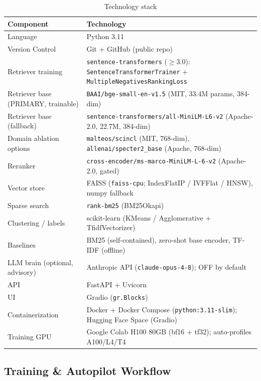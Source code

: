 \documentclass[12pt,a4paper]{article}
\begin{document}
\begin{table}[H]
\centering
\caption{Technology stack}
\small
\begin{tabularx}{\linewidth}{@{} l L @{}}
\toprule
\textbf{Component} & \textbf{Technology} \\
\midrule
Language & Python 3.11 \\
Version Control & Git + GitHub (public repo) \\
Retriever training & \texttt{sentence-transformers} ($\geq$3.0): \texttt{SentenceTransformerTrainer} + \texttt{MultipleNegativesRankingLoss} \\
Retriever base (PRIMARY, trainable) & \texttt{BAAI/bge-small-en-v1.5} (MIT, 33.4M params, 384-dim) \\
Retriever base (fallback) & \texttt{sentence-transformers/all-MiniLM-L6-v2} (Apache-2.0, 22.7M, 384-dim) \\
Domain ablation options & \texttt{malteos/scincl} (MIT, 768-dim), \texttt{allenai/specter2\_base} (Apache, 768-dim) \\
Reranker & \texttt{cross-encoder/ms-marco-MiniLM-L-6-v2} (Apache-2.0, gated) \\
Vector store & FAISS (\texttt{faiss-cpu}; IndexFlatIP / IVFFlat / HNSW), numpy fallback \\
Sparse search & \texttt{rank-bm25} (BM25Okapi) \\
Clustering / labels & scikit-learn (KMeans / Agglomerative + TfidfVectorizer) \\
Baselines & BM25 (self-contained), zero-shot base encoder, TF-IDF (offline) \\
LLM brain (optional, advisory) & Anthropic API (\texttt{claude-opus-4-8}); OFF by default \\
API & FastAPI + Uvicorn \\
UI & Gradio (\texttt{gr.Blocks}) \\
Containerization & Docker + Docker Compose (\texttt{python:3.11-slim}); Hugging Face Space (Gradio) \\
Training GPU & Google Colab H100 80GB (bf16 + tf32); auto-profiles A100/L4/T4 \\
\bottomrule
\end{tabularx}
\end{table}

\subsection{Training \& Autopilot Workflow}
\label{subsec:workflow}
\end{document}
